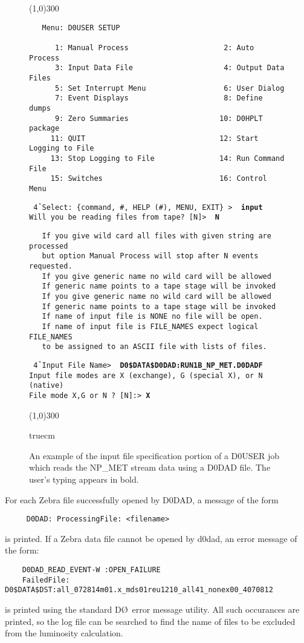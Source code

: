 \begin{figure}
   \centerline{\line(1,0){300}}
   \begin{verbatim}
   Menu: D0USER SETUP 
   
      1: Manual Process                      2: Auto Process
      3: Input Data File                     4: Output Data Files
      5: Set Interrupt Menu                  6: User Dialog
      7: Event Displays                      8: Define dumps
      9: Zero Summaries                     10: D0HPLT package
     11: QUIT                               12: Start Logging to File
     13: Stop Logging to File               14: Run Command File
     15: Switches                           16: Control Menu
   \end{verbatim}
   {\tt 
   \h4 Select: \{command, \#, HELP (\#), MENU, EXIT\} > { \bf input} \\
    Will you be reading files from tape? [N]> { \bf N}
   }
   \begin{verbatim}
   If you give wild card all files with given string are processed
   but option Manual Process will stop after N events requested.
   If you give generic name no wild card will be allowed
   If generic name points to a tape stage will be invoked
   If you give generic name no wild card will be allowed
   If generic name points to a tape stage will be invoked
   If name of input file is NONE no file will be open.
   If name of input file is FILE_NAMES expect logical FILE_NAMES
   to be assigned to an ASCII file with lists of files.
   \end{verbatim}
   {\tt
   \h4 Input File Name> { \bf D0\$DATA\$D0DAD:RUN1B\_NP\_MET.D0DADF } \\
    Input file modes are X (exchange), G (special X), or N (native) \\
    File mode X,G or N ? [N]:> {\bf X}
   }

   \centerline{\line(1,0){300}}
    truecm

  \caption{An example of the input file specification portion of a D0USER job 
      which reads the NP\_MET stream data using a D0DAD file.  The user's
      typing appears in bold.\label{f-easy}}
\end{figure}

\par
For each Zebra file successfully opened by D0DAD, a message of the form
\begin{verbatim}
     D0DAD: ProcessingFile: <filename>
\end{verbatim}
is printed.
If a Zebra data file cannot be opened by d0dad, an error message of the form:
\begin{verbatim}
    D0DAD_READ_EVENT-W :OPEN_FAILURE
    FailedFile: D0$DATA$DST:all_072814m01.x_mds01reu1210_all41_nonex00_4070812
\end{verbatim}
is printed using the standard D\O\ error message utility.  All such occurances
are printed, so the log file can be searched to find the name of files to be
excluded from the luminosity calculation.  

